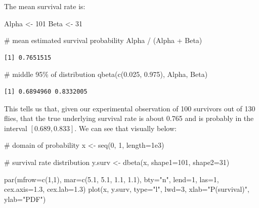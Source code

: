 \documentclass[
  13,
  letterpaper,
]{report}
\newenvironment{Shaded}{\begin{snugshade}}{\end{snugshade}}
\newcommand{\AttributeTok}[1]{\textcolor[rgb]{0.40,0.45,0.13}{#1}}
\newcommand{\CommentTok}[1]{\textcolor[rgb]{0.37,0.37,0.37}{#1}}
\newcommand{\DecValTok}[1]{\textcolor[rgb]{0.68,0.00,0.00}{#1}}
\newcommand{\FloatTok}[1]{\textcolor[rgb]{0.68,0.00,0.00}{#1}}
\newcommand{\FunctionTok}[1]{\textcolor[rgb]{0.28,0.35,0.67}{#1}}
\newcommand{\NormalTok}[1]{\textcolor[rgb]{0.00,0.23,0.31}{#1}}
\newcommand{\OtherTok}[1]{\textcolor[rgb]{0.00,0.23,0.31}{#1}}
\newcommand{\SpecialCharTok}[1]{\textcolor[rgb]{0.37,0.37,0.37}{#1}}
\newcommand{\StringTok}[1]{\textcolor[rgb]{0.13,0.47,0.30}{#1}}
\begin{document}
The mean survival rate is:

\begin{Shaded}
\begin{Highlighting}[]
\NormalTok{Alpha }\OtherTok{\textless{}{-}} \DecValTok{101}
\NormalTok{Beta }\OtherTok{\textless{}{-}} \DecValTok{31}

\CommentTok{\# mean estimated survival probability}
\NormalTok{Alpha }\SpecialCharTok{/}\NormalTok{ (Alpha }\SpecialCharTok{+}\NormalTok{ Beta)}
\end{Highlighting}
\end{Shaded}

\begin{verbatim}
[1] 0.7651515
\end{verbatim}

\begin{Shaded}
\begin{Highlighting}[]
\CommentTok{\# middle 95\% of distribution}
\FunctionTok{qbeta}\NormalTok{(}\FunctionTok{c}\NormalTok{(}\FloatTok{0.025}\NormalTok{, }\FloatTok{0.975}\NormalTok{), Alpha, Beta)}
\end{Highlighting}
\end{Shaded}

\begin{verbatim}
[1] 0.6894960 0.8332005
\end{verbatim}

This tells us that, given our experimental observation of 100 survivors
out of 130 flies, that the true underlying survival rate is about 0.765
and is probably in the interval \(\left[0.689,0.833\right]\). We can see
that visually below:

\begin{Shaded}
\begin{Highlighting}[]
\CommentTok{\# domain of probability}
\NormalTok{x }\OtherTok{\textless{}{-}} \FunctionTok{seq}\NormalTok{(}\DecValTok{0}\NormalTok{, }\DecValTok{1}\NormalTok{, }\AttributeTok{length=}\FloatTok{1e3}\NormalTok{)}

\CommentTok{\# survival rate distribution}
\NormalTok{y.surv }\OtherTok{\textless{}{-}} \FunctionTok{dbeta}\NormalTok{(x, }\AttributeTok{shape1=}\DecValTok{101}\NormalTok{, }\AttributeTok{shape2=}\DecValTok{31}\NormalTok{)}

\FunctionTok{par}\NormalTok{(}\AttributeTok{mfrow=}\FunctionTok{c}\NormalTok{(}\DecValTok{1}\NormalTok{,}\DecValTok{1}\NormalTok{), }\AttributeTok{mar=}\FunctionTok{c}\NormalTok{(}\FloatTok{5.1}\NormalTok{, }\FloatTok{5.1}\NormalTok{, }\FloatTok{1.1}\NormalTok{, }\FloatTok{1.1}\NormalTok{),}
    \AttributeTok{bty=}\StringTok{"n"}\NormalTok{, }\AttributeTok{lend=}\DecValTok{1}\NormalTok{, }\AttributeTok{las=}\DecValTok{1}\NormalTok{, }
    \AttributeTok{cex.axis=}\FloatTok{1.3}\NormalTok{, }\AttributeTok{cex.lab=}\FloatTok{1.3}\NormalTok{)}
\FunctionTok{plot}\NormalTok{(x, y.surv, }\AttributeTok{type=}\StringTok{"l"}\NormalTok{, }\AttributeTok{lwd=}\DecValTok{3}\NormalTok{, }
    \AttributeTok{xlab=}\StringTok{"P(survival)"}\NormalTok{, }\AttributeTok{ylab=}\StringTok{"PDF"}\NormalTok{)}
\end{Highlighting}
\end{Shaded}
\end{document}
